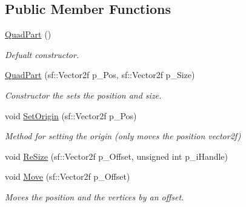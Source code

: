 \subsection*{Public Member Functions}
\begin{DoxyCompactItemize}
\item 
\mbox{\label{class_quad_part_a953ac1358c8bdd586bb477a02d42434f}} 
\hyperlink{class_quad_part_a953ac1358c8bdd586bb477a02d42434f}{Quad\+Part} ()
\begin{DoxyCompactList}\small\item\em Defualt constructor. \end{DoxyCompactList}\item 
\mbox{\label{class_quad_part_a20fce309e6b74fc24d04f6cee536600a}} 
\hyperlink{class_quad_part_a20fce309e6b74fc24d04f6cee536600a}{Quad\+Part} (sf\+::\+Vector2f p\+\_\+\+Pos, sf\+::\+Vector2f p\+\_\+\+Size)
\begin{DoxyCompactList}\small\item\em Constructor the sets the position and size. \end{DoxyCompactList}\item 
\mbox{\label{class_quad_part_ac4f581071de7de0dff0a757a958f67d8}} 
void \hyperlink{class_quad_part_ac4f581071de7de0dff0a757a958f67d8}{Set\+Origin} (sf\+::\+Vector2f p\+\_\+\+Pos)
\begin{DoxyCompactList}\small\item\em Method for setting the origin (only moves the position vector2f) \end{DoxyCompactList}\item 
void \hyperlink{class_quad_part_abd2f83c6c31cb1a05c97bc5711a22564}{Re\+Size} (sf\+::\+Vector2f p\+\_\+\+Offset, unsigned int p\+\_\+i\+Handle)
\item 
\mbox{\label{class_quad_part_a7bd2f2bdb282afb965cc54847c6edfec}} 
void \hyperlink{class_quad_part_a7bd2f2bdb282afb965cc54847c6edfec}{Move} (sf\+::\+Vector2f p\+\_\+\+Offset)
\begin{DoxyCompactList}\small\item\em Moves the position and the vertices by an offset. \end{DoxyCompactList}\item 
\mbox{\label{class_quad_part_ae93071d8999ff84fb5a428c21ba0056b}} 

\end{DoxyCompactItemize}
